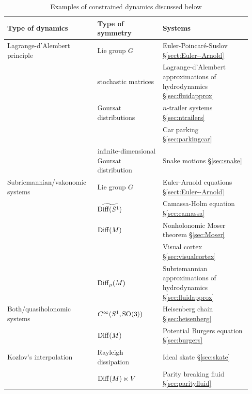 \documentclass[11pt]{article}
\theoremstyle{definition}
\newcounter{ai}
\begin{document}
\begin{table}[t]
\centering
\caption{Examples of constrained dynamics discussed below}
\label{tab:intro-summary}
\renewcommand{\arraystretch}{1.12}
\setlength{\tabcolsep}{5pt}
\begin{tabularx}{\textwidth}{
>{\raggedright\arraybackslash}p{4.6cm}
>{\raggedright\arraybackslash}p{4.2cm}
>{\raggedright\arraybackslash}X}
\hline
\textbf{Type of dynamics} & \textbf{Type of symmetry} & \textbf{Systems} \\
\hline
Lagrange-d'Alembert principle
&Lie group $G$ 
&Euler-Poincar\'e-Suslov \hyperref[sect:Euler--Arnold]{\S\ref*{sect:Euler--Arnold}}\\
& stochastic matrices & Lagrange-d'Alembert approximations of hydrodynamics \hyperref[sec:fluidapprox]{\S\ref*{sec:fluidapprox}}\\
& Goursat distributions & $n$-trailer systems \hyperref[sec:ntrailers]{\S\ref*{sec:ntrailers}}\\
& & Car parking \hyperref[sec:parkingcar]{\S\ref*{sec:parkingcar}}\\
& infinite-dimensional Goursat distribution& Snake motions \hyperref[sec:snake]{\S\ref*{sec:snake}}\\
\hline
Subriemannian/vakonomic systems
&Lie group $G$ 
&Euler-Arnold equations \hyperref[sect:Euler--Arnold]{\S\ref*{sect:Euler--Arnold}}\\
& $\widetilde{ {\rm Diff}(S^1)}$ & Camassa-Holm equation \hyperref[sec:camassa]{\S\ref*{sec:camassa}}\\
& ${\rm Diff}(M)$ & Nonholonomic Moser theorem \hyperref[sec:Moser]{\S\ref*{sec:Moser}}\\
& & Visual cortex \hyperref[sec:visualcortex]{\S\ref*{sec:visualcortex}}\\
& ${\rm Diff}_\mu(M)$ & Subriemannian approximations of hydrodynamics \hyperref[sec:fluidapprox]{\S\ref*{sec:fluidapprox}}\\
\hline
Both/quasiholonomic systems
&$C^\infty(S^1,{\rm SO}(3))$ 
& Heisenberg chain \hyperref[sec:heisenberg]{\S\ref*{sec:heisenberg}}\\
& ${\rm Diff}(M)$ & Potential Burgers equation \hyperref[sec:burgers]{\S\ref*{sec:burgers}}\\
\hline
Kozlov's interpolation
& Rayleigh dissipation& Ideal skate \hyperref[sec:skate]{\S\ref*{sec:skate}}\\
& ${\rm Diff}(M)\ltimes V$ 
& Parity breaking fluid  \hyperref[sec:parityfluid]{\S\ref*{sec:parityfluid}}\\
\hline
\end{tabularx}
\end{table}
\end{document}
